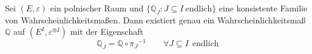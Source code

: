 \label{Existenzsatz von Daniel und Kolmogorov}
Sei $(E, \varepsilon)$ ein polnischer Raum und $\lbrace \mathbb{Q}_{J} : J \subseteq I \: \mathrm{endlich}\rbrace$ eine konsistente Familie von Wahrscheinlichkeitsmaßen. Dann existiert genau ein Wahrscheinlichkeitsmaß $\mathbb{Q}$ auf $(E^{I},\varepsilon^{ \otimes I})$ mit der Eigenschaft
\begin{equation}
{\mathbb{Q}}_{J} = \mathbb{Q} \circ {\pi_{J}}^{-1} \qquad \forall J \subseteq I \: \: \mathrm{endlich}
\label{eins}
\end{equation}